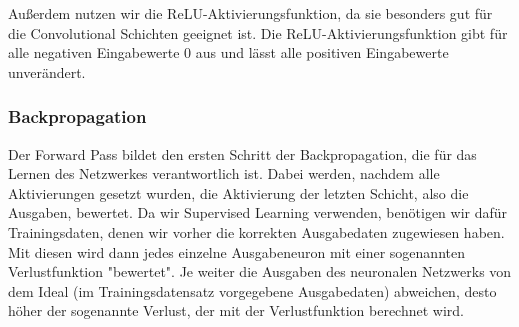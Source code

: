 \documentclass[10pt]{article}
\begin{document}
Außerdem nutzen wir die ReLU-Aktivierungsfunktion, da sie besonders gut für die Convolutional Schichten geeignet ist. Die ReLU-Aktivierungsfunktion gibt für alle negativen Eingabewerte 0 aus und lässt alle positiven Eingabewerte unverändert.

\subsubsection{Backpropagation}




        

        
        


\newcommand{\textD}{$\delta$}

Der Forward Pass bildet den ersten Schritt der Backpropagation, die für das Lernen des Netzwerkes verantwortlich ist. Dabei werden, nachdem alle Aktivierungen gesetzt wurden, die Aktivierung der letzten Schicht, also die Ausgaben, bewertet.
Da wir Supervised Learning verwenden, benötigen wir dafür Trainingsdaten, denen wir vorher die korrekten Ausgabedaten zugewiesen haben.
Mit diesen wird dann jedes einzelne Ausgabeneuron mit einer sogenannten Verlustfunktion "bewertet". Je weiter die Ausgaben des neuronalen Netzwerks von dem Ideal (im Trainingsdatensatz vorgegebene Ausgabedaten) abweichen, desto höher der sogenannte Verlust, der mit der Verlustfunktion berechnet wird.
\end{document}
